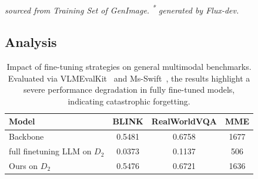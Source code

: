 \documentclass{article}
\theoremstyle{plain}
\theoremstyle{definition}
\theoremstyle{remark}
\begin{document}
\begin{table}[t]
\centering
\caption{Source composition of our datasets $D_{1}$ and $D_{2}$.}
\label{tab:dataset}
\vspace{1mm}
\\
\raggedright \scriptsize{\emph{\textsuperscript{\dag} sourced from Training Set of GenImage.} \emph{\textsuperscript{*} generated by Flux-dev.}}

\end{table}




\subsection{Analysis}
\label{analysis}


\begin{table}[t]
  \centering
  \tiny
  \caption{Impact of fine-tuning strategies on general multimodal benchmarks. Evaluated via VLMEvalKit~\cite{duan2024vlmevalkit} and Ms-Swift~\cite{zhao2025swift}, the results highlight a severe performance degradation in fully fine-tuned models, indicating catastrophic forgetting.}
  \setlength{\tabcolsep}{10pt}
  \label{tab:commonbench}
  \begin{tabular}{lccc}
    \toprule
    \textbf{Model} &\textbf{BLINK} &\textbf{RealWorldVQA} &\textbf{MME} \\
    \midrule
    Backbone &0.5481 &0.6758 &1677 \\
    full finetuning LLM on $D_2$ &0.0373 &0.1137 &506 \\
    \midrule
    Ours on $D_2$ &0.5476 &0.6721 &1636 \\
    \bottomrule
  \end{tabular}
\end{table}
\end{document}
